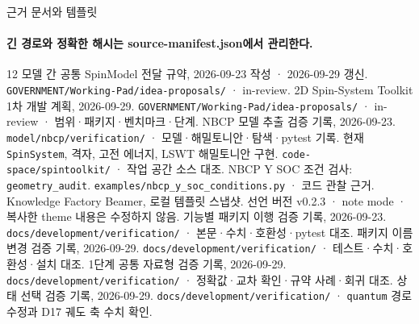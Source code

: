 \begin{frame}[label=sources]{근거 문서와 템플릿}
  \framesubtitle{긴 경로와 정확한 해시는 source-manifest.json에서 관리한다.}
  \small
  \begin{thebibliography}{12}
      모델 간 공통 SpinModel 전달 규약, 2026-09-23 작성 · 2026-09-29 갱신.
      \newblock \texttt{GOVERNMENT/Working-Pad/idea-proposals/} · in-review.
      2D Spin-System Toolkit 1차 개발 계획, 2026-09-29.
      \newblock \texttt{GOVERNMENT/Working-Pad/idea-proposals/} · in-review · 범위·패키지·벤치마크·단계.
      NBCP 모델 추출 검증 기록, 2026-09-23.
      \newblock \texttt{model/nbcp/verification/} · 모델·해밀토니안·탐색·pytest 기록.
      현재 \texttt{SpinSystem}, 격자, 고전 에너지, LSWT 해밀토니안 구현.
      \newblock \texttt{code-space/spintoolkit/} · 작업 공간 소스 대조.
      NBCP Y SOC 조건 검사: \texttt{geometry\_audit}.
      \newblock \texttt{examples/nbcp\_y\_soc\_conditions.py} · 코드 관찰 근거.
      Knowledge Factory Beamer, 로컬 템플릿 스냅샷.
      \newblock 선언 버전 v0.2.3 · note mode · 복사한 theme 내용은 수정하지 않음.
      기능별 패키지 이행 검증 기록, 2026-09-23.
      \newblock \texttt{docs/development/verification/} · 본문·수치·호환성·pytest 대조.
      패키지 이름 변경 검증 기록, 2026-09-29.
      \newblock \texttt{docs/development/verification/} · 테스트·수치·호환성·설치 대조.
      1단계 공통 자료형 검증 기록, 2026-09-29.
      \newblock \texttt{docs/development/verification/} · 정확값·교차 확인·규약 사례·회귀 대조.
      상태 선택 검증 기록, 2026-09-29.
      \newblock \texttt{docs/development/verification/} · \texttt{quantum} 경로 수정과 D17 궤도 축 수치 확인.
  \end{thebibliography}
\end{frame}


